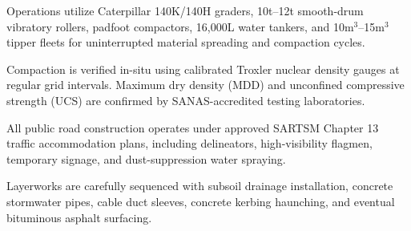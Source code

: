 \noindent
\begin{minipage}[t]{0.485\textwidth}
    \begin{tcolorbox}[enhanced, colback=white, colframe=mhlightgray, boxrule=0.8pt, arc=4pt, title={\bfseries\color{white}\faTruckMonster\ Dedicated Plant Spreads}, colbacktitle=mhnavy, left=8pt, right=8pt, top=7pt, bottom=7pt, drop shadow=black!4]
        {\fontsize{8.1pt}{11.3pt}\selectfont\color{mhtext}
        Operations utilize Caterpillar 140K/140H graders, 10t--12t smooth-drum vibratory rollers, padfoot compactors, 16,000L water tankers, and 10m$^3$--15m$^3$ tipper fleets for uninterrupted material spreading and compaction cycles.
        }
    \end{tcolorbox}
\end{minipage}
\hfill
\begin{minipage}[t]{0.485\textwidth}
    \begin{tcolorbox}[enhanced, colback=white, colframe=mhlightgray, boxrule=0.8pt, arc=4pt, title={\bfseries\color{white}\faClipboardCheck\ Troxler Density Testing}, colbacktitle=mhblue, left=8pt, right=8pt, top=7pt, bottom=7pt, drop shadow=black!4]
        {\fontsize{8.1pt}{11.3pt}\selectfont\color{mhtext}
        Compaction is verified in-situ using calibrated Troxler nuclear density gauges at regular grid intervals. Maximum dry density (MDD) and unconfined compressive strength (UCS) are confirmed by SANAS-accredited testing laboratories.
        }
    \end{tcolorbox}
\end{minipage}

\vspace{0.18cm}

\noindent
\begin{minipage}[t]{0.485\textwidth}
    \begin{tcolorbox}[enhanced, colback=white, colframe=mhlightgray, boxrule=0.8pt, arc=4pt, title={\bfseries\color{white}\faTrafficLight\ Traffic Accommodation \& Safety}, colbacktitle=mhnavy, left=8pt, right=8pt, top=7pt, bottom=7pt, drop shadow=black!4]
        {\fontsize{8.1pt}{11.3pt}\selectfont\color{mhtext}
        All public road construction operates under approved SARTSM Chapter 13 traffic accommodation plans, including delineators, high-visibility flagmen, temporary signage, and dust-suppression water spraying.
        }
    \end{tcolorbox}
\end{minipage}
\hfill
\begin{minipage}[t]{0.485\textwidth}
    \begin{tcolorbox}[enhanced, colback=white, colframe=mhlightgray, boxrule=0.8pt, arc=4pt, title={\bfseries\color{white}\faLink\ Multi-Trade Civil Alignment}, colbacktitle=mhblue, left=8pt, right=8pt, top=7pt, bottom=7pt, drop shadow=black!4]
        {\fontsize{8.1pt}{11.3pt}\selectfont\color{mhtext}
        Layerworks are carefully sequenced with subsoil drainage installation, concrete stormwater pipes, cable duct sleeves, concrete kerbing haunching, and eventual bituminous asphalt surfacing.
        }
    \end{tcolorbox}
\end{minipage}

